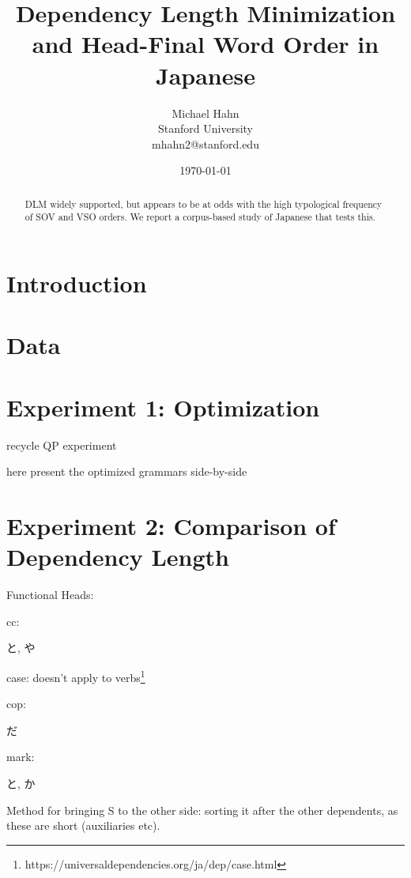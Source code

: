 \documentclass[11pt,a4paper]{article}
\title{Dependency Length Minimization and Head-Final Word Order in Japanese}
\author{Michael Hahn \\ Stanford University \\ mhahn2@stanford.edu}
\date{\today}
\begin{document}
\maketitle
\begin{abstract}
DLM widely supported, but appears to be at odds with the high typological frequency of SOV and VSO orders.
We report a corpus-based study of Japanese that tests this.
\end{abstract}

\section{Introduction}

\section{Data}

\section{Experiment 1: Optimization}

recycle QP experiment

here present the optimized grammars side-by-side

\section{Experiment 2: Comparison of Dependency Length}

Functional Heads:

cc: \begin{CJK}{UTF8}{min}と, や\end{CJK} 

case: doesn't apply to verbs\footnote{https://universaldependencies.org/ja/dep/case.html}

cop: \begin{CJK}{UTF8}{min}だ\end{CJK} 

mark: \begin{CJK}{UTF8}{min}と, か\end{CJK} 

Method for bringing S to the other side: sorting it after the other dependents, as these are short (auxiliaries etc).
\end{document}

